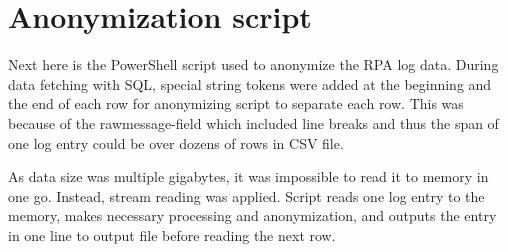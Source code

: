 

\section{Anonymization script}\label{sec:app-anonymization-script}

Next here is the PowerShell script used
to anonymize the RPA log data.
During data fetching with SQL,
special string tokens were added at the beginning and the end of each row
for anonymizing script to separate each row.
This was because of the rawmessage-field
which included line breaks
and thus the span of one log entry could be over dozens of rows in CSV file.

As data size was multiple gigabytes,
it was impossible to read it to memory in one go.
Instead,
stream reading was applied.
Script reads one log entry to the memory,
makes necessary processing and anonymization,
and outputs the entry in one line to output file
before reading the next row.


